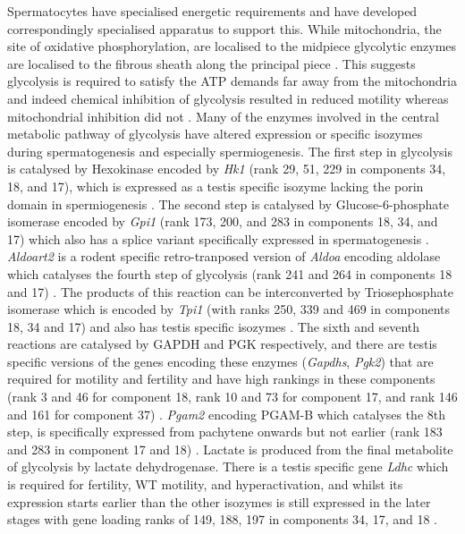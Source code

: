 Spermatocytes have specialised energetic requirements and have developed correspondingly specialised apparatus to support this. While mitochondria, the site of oxidative phosphorylation, are localised to the midpiece glycolytic enzymes are localised to the fibrous sheath along the principal piece \parencite{Westhoff1997Glyceraldehyde, Krisfalusi2006Multiple}. This suggests glycolysis is required to satisfy the ATP demands far away from the mitochondria and indeed chemical inhibition of glycolysis resulted in reduced motility whereas mitochondrial inhibition did not \parencite{Mukai2004Glycolysis}.
Many of the enzymes involved in the central metabolic pathway of glycolysis have altered expression or specific isozymes during spermatogenesis and especially spermiogenesis.
The first step in glycolysis is catalysed by Hexokinase encoded by \textit{Hk1} (rank 29, 51, 229 in components 34, 18, and 17), which is expressed as a testis specific isozyme lacking the porin domain in spermiogenesis \parencite{Mori1993Unique,Nakamura2008Spermatogenic}.
The second step is catalysed by Glucose-6-phosphate isomerase encoded by \textit{Gpi1} (rank 173, 200, and 283 in components 18, 34, and 17) which also has a splice variant specifically expressed in spermatogenesis \parencite{Buehr1981electrophoretically, Vemuganti2010Frequent}.
\textit{Aldoart2} is a rodent specific retro-tranposed version of \textit{Aldoa} encoding aldolase which catalyses the fourth step of glycolysis (rank 241 and 264 in components 18 and 17) \parencite{Vemuganti2007Three, Vemuganti2010Frequent}.
The products of this reaction can be interconverted by Triosephosphate isomerase which is encoded by \textit{Tpi1} (with ranks 250, 339 and 469 in components 18, 34 and 17) and also has testis specific isozymes \parencite{Ijiri2013Male}.
The sixth and seventh reactions are catalysed by GAPDH and PGK respectively, and there are testis specific versions of the genes encoding these enzymes (\textit{Gapdhs}, \textit{Pgk2}) that are required for motility and fertility and have high rankings in these components (rank 3 and 46 for component 18, rank 10 and 73 for component 17, and rank 146 and 161 for component 37) \parencite{McCarrey1987Human,Welch1992Expression, Miki2004Glyceraldehyde, Danshina2010Phosphoglycerate}.
\textit{Pgam2} encoding PGAM-B which catalyses the 8th step, is specifically expressed from pachytene onwards but not earlier (rank 183 and 283 in component 17 and 18) \parencite{Fundele1987Developmental}.
Lactate is produced from the final metabolite of glycolysis by lactate dehydrogenase.
There is a testis specific gene \textit{Ldhc} which is required for fertility, WT motility, and hyperactivation, and whilst its expression starts earlier than the other isozymes is still expressed in the later stages with gene loading ranks of 149, 188, 197 in components 34, 17, and 18 \parencite{Sakai1987Molecular, Odet2008Expression}.

